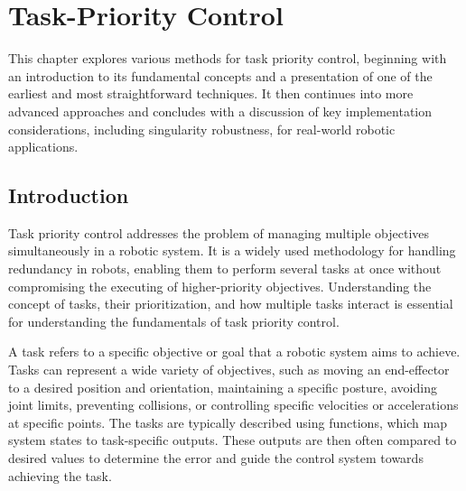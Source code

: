 \chapter{Task-Priority Control}

This chapter explores various methods for task priority control, beginning with
an introduction to its fundamental concepts and a presentation of one of the
earliest and most straightforward techniques. It then continues into more advanced
approaches and concludes with a discussion of key implementation considerations,
including singularity robustness, for real-world robotic applications.

\section{Introduction}
\label{sec:tpc_intro}
\iffalse
Task priority control addresses the problem of managing multiple objectives simultaneously.
Each task is assigned a specific priority level, and the goal is to prioritize the higher-level
tasks my minimizing its error while balancing the lower-priority objectives. The
following sections are based largely on the work of \cite{antonelli2009}, which provides
an excellent overview of the topic in terms of velocity level control. The concepts
of velocity-, acceleration- and force-level control are to be defined in the
following sections.
\fi

Task priority control addresses the problem of managing multiple objectives simultaneously in a robotic system. It is a widely used methodology for handling redundancy in robots, enabling them to perform several tasks at once without compromising the executing of higher-priority objectives. Understanding the concept of tasks, their prioritization, and how multiple tasks interact is essential for understanding the fundamentals of task priority control.

A task refers to a specific objective or goal that a robotic system aims to achieve. Tasks can represent a wide variety of objectives, such as moving an end-effector to a desired position and orientation, maintaining a specific posture, avoiding joint limits, preventing collisions, or controlling specific velocities or accelerations at specific points. The tasks are typically described using functions, which map system states to task-specific outputs. These outputs are then often compared to desired values to determine the error and guide the control system towards achieving the task.

